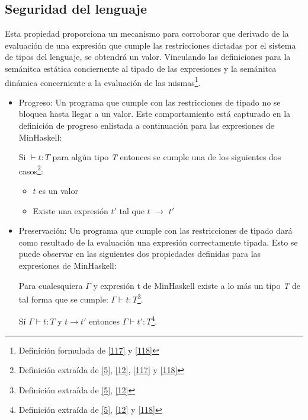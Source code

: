     \subsection{Seguridad del lenguaje}
        Esta propiedad  proporciona un mecanismo para corroborar que derivado de la evaluación de una expresión que cumple las restricciones dictadas por el sistema de tipos del lenguaje, se obtendrá un valor. Vinculando las definiciones para la semánitca estática conciernente al tipado de las expresiones y la semánitca dinámica concerniente a la evaluación de las mismas\footnote{Definición formulada de \hyperlink{117}{[117]} y \hyperlink{118}{[118]}}.
        
        \begin{itemize}
            \item Progreso: Un programa que cumple con las restricciones de tipado no se bloquea hasta llegar a un valor. Este comportamiento está capturado en la definición de progreso enlistada a continuación para las expresiones de \textsf{MinHaskell}:
             
             \begin{definition}
                Si $\vdash t : \textit{T}$ para algún tipo \textit{T} entonces se cumple una de los siguientes dos casos\footnote{Definición extraída de  \hyperlink{5}{[5]},  \hyperlink{12}{[12]}, \hyperlink{117}{[117]} y  \hyperlink{118}{[118]}}:
                \begin{itemize}
			\item $t$ es un valor 
                	\item Existe una expresión $t'$ tal que $t$ $\to$ $t'$
		   \end{itemize}
             \end{definition}
            \item Preservación: Un programa que cumple con las restricciones de tipado dará como resultado de la evaluación una expresión correctamente tipada. Esto se puede observar en las siguientes dos propiedades definidas para las expresiones de \textsf{MinHaskell}:
                
                    \begin{definition}
                        Para cualesquiera $\Gamma$ y expresión t de \textsf{MinHaskell} existe a lo más un tipo \textit{T} de tal forma que se cumple: $\Gamma \vdash t : \textit{T}$\footnote{Definición extraída de \hyperlink{5}{[5]},  \hyperlink{12}{[12]}}.\\    
                    \end{definition}
                    
                     \begin{definition}
                        Sí $\Gamma \vdash t : \textit{T}$ y $t \to t'$ entonces $\Gamma \vdash t' : \textit{T}$\footnote{Definición extraída de  \hyperlink{5}{[5]},  \hyperlink{12}{[12]}  y \hyperlink{118}{[118]}}.
                    \end{definition}

        \end{itemize}

